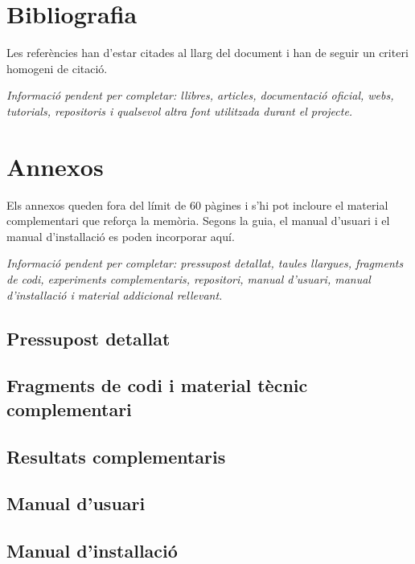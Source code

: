 \documentclass[11pt,a4paper]{article}
\newcommand{\requiredinfo}[1]{%
  \vspace{0.4em}%
  {\color{placeholdergray}\textit{Informaci\'o pendent per completar: #1.}}\par
}
\newcommand{\sectionintro}[1]{%
  \vspace{0.25em}%
  #1\par
}
\begin{document}
\section{Bibliografia}
\sectionintro{Les refer\`encies han d'estar citades al llarg del document i han de seguir un criteri homogeni de citaci\'o.}\requiredinfo{llibres, articles, documentaci\'o oficial, webs, tutorials, repositoris i qualsevol altra font utilitzada durant el projecte}

\appendix
\section{Annexos}
\sectionintro{Els annexos queden fora del l\'imit de 60 p\`agines i s'hi pot incloure el material complementari que refor\c{c}a la mem\`oria. Segons la guia, el manual d'usuari i el manual d'instal\textperiodcentered laci\'o es poden incorporar aqu\'i.}
\requiredinfo{pressupost detallat, taules llargues, fragments de codi, experiments complementaris, repositori, manual d'usuari, manual d'instal\textperiodcentered laci\'o i material addicional rellevant}

\subsection{Pressupost detallat}
\subsection{Fragments de codi i material t\`ecnic complementari}
\subsection{Resultats complementaris}
\subsection{Manual d'usuari}
\subsection{Manual d'instal\textperiodcentered laci\'o}
\end{document}
